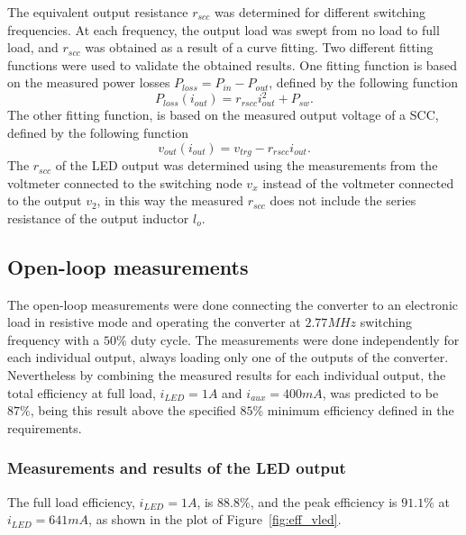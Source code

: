 The equivalent output resistance $r_{scc}$ was determined for different switching frequencies. At each frequency, the output load was swept from no load to full load, and  $r_{scc}$ was obtained as a result of a curve fitting. Two different fitting functions were used to validate the obtained results. One fitting function is based on the measured power losses $P_{loss} = P_{in} - P_{out}$, defined by the following function
\begin{equation}
 P_{loss}(i_{out}) = r_{rscc} i_{out}^2 + P_{sw}.
\end{equation}
The other fitting function, is based on the measured output voltage of a SCC, defined by the following function
\begin{equation}
 v_{out}(i_{out}) = v_{trg} -  r_{rscc} i_{out}.
\end{equation}
The $r_{scc}$ of the LED output was determined using the measurements from the voltmeter connected to the  switching node $v_x$ instead of  the voltmeter connected to the output  $v_2$, in this way the measured $r_{scc}$ does not include the series resistance of the output inductor $l_o$.

\subsection{Open-loop measurements}
The open-loop measurements were done connecting the converter to an electronic load in resistive mode and operating the converter at $2.77MHz$ switching frequency with a $50\%$ duty cycle. The measurements were done independently for each individual output, always loading only one of the outputs of the converter. Nevertheless by combining the measured results for each individual output, the total efficiency at full load, $i_{LED}=1A$ and $i_{aux}=400mA$, was predicted to be $87\%$, being this result above the specified $85\%$ minimum efficiency defined in the requirements.


\subsubsection{Measurements and results of the LED output}
The full load efficiency, $i_{LED}=1A$, is $88.8\%$, and the peak efficiency is $91.1\%$ at $i_{LED}=641mA$, as shown in the plot of Figure~\ref{fig:eff_vled}.

